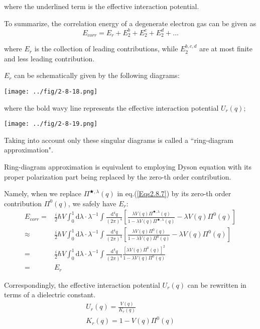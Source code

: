 where the underlined term is the effective interaction potential.

To summarize, the correlation energy of a degenerate electron gas can be given as
\[E_{corr} = E_r + E_2^b + E_2^c + E_2^d+\ldots\]

where $E_r$ is the collection of leading contributions, while $E_2^{b,c,d}$ are at most finite and less leading contribution.

$E_r$ can be schematically given by the following diagrams:
\begin{center} \label{Fig2.8.18}
\texttt{[image: ../fig/2-8-18.png]}
\end{center}

where the bold wavy line represents the effective interaction potential $U_r(q)$;
\begin{center} \label{Fig2.8.19}
\texttt{[image: ../fig/2-8-19.png]}
\end{center}

Taking into account only these singular diagrams is called a ``ring-diagram approximation".

Ring-diagram approximation is equivalent to employing Dyson equation with its proper polarization part being replaced by the zero-th order contribution.

Namely, when we replace $\Pi^{\bigstar,\lambda}(q)$ in eq.(\ref{Eqs2.8.7}) by its zero-th order contribution $\Pi^0(q)$, we safely have $E_r$:
\begin{equation*} \begin{split}
E_{corr} =&\frac{i}{2} \hbar V \int_0^1 \mathrm{d}\lambda \cdot \lambda^{-1} \int \frac{\mathrm{d}^4 q}{(2\pi)^4} \left[ \frac{\lambda V(q) \Pi^{\bigstar,\lambda}(q)}{1- \lambda V(q) \Pi^{\bigstar,\lambda}(q)} - \lambda V(q)\Pi^0(q) \right]\\
\approx& \frac{i}{2} \hbar V \int_0^1 \mathrm{d}\lambda \cdot \lambda^{-1} \int \frac{\mathrm{d}^4 q}{(2\pi)^4} \left[ \frac{\lambda V(q) \Pi^0(q)}{1- \lambda V(q) \Pi^0(q)} - \lambda V(q)\Pi^0(q) \right]\\
=& \frac{i}{2} \hbar V \int_0^1 \mathrm{d}\lambda \cdot \lambda^{-1} \int \frac{\mathrm{d}^4 q}{(2\pi)^4} \frac{[\lambda V(q) \Pi^0(q)]^2}{1- \lambda V(q) \Pi^0(q)}\\
=& E_r 
\end{split}\end{equation*}

Correspondingly, the effective interaction potential $U_r(q)$ can be rewritten in terms of a dielectric constant.
\begin{eqnarray}
U_r(q) = \frac{V(q)}{K_r(q)} \label{Eqs2.8.10}\\
K_r(q) = 1-V(q) \Pi^0(q) \label{Eqs2.8.11}
\end{eqnarray}

